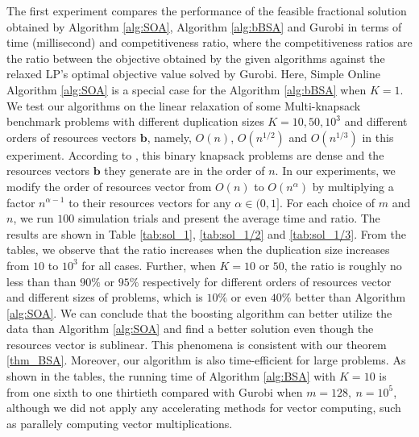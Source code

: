 \documentclass{article} %
\begin{document}
The first experiment compares the performance of the feasible fractional solution obtained by Algorithm \ref{alg:SOA}, Algorithm \ref{alg:bBSA} and Gurobi in terms of time (millisecond) and competitiveness ratio, where the competitiveness ratios are the ratio between the objective obtained by the given algorithms against the relaxed LP's optimal objective value solved by Gurobi. Here, Simple Online Algorithm \ref{alg:SOA} is a special case for the Algorithm \ref{alg:bBSA} when $K=1$. We test our algorithms on the linear relaxation of some Multi-knapsack benchmark problems \citep{chu1998genetic} with different duplication sizes $K=10,50,10^3$ and different orders of resources vectors $\bm{b}$, namely, $O(n)$, $O(n^{1/2})$ and $O(n^{1/3})$ in this experiment. 
According to \cite{chu1998genetic}, this binary knapsack problems are dense and the resources vectors $\bm{b}$ they generate are in the order of $n$. In our experiments, we modify the order of resources vector from $O(n)$ to $O(n^\alpha)$ by multiplying a factor $n^{\alpha-1}$ to their resources vectors for any $\alpha\in(0,1]$. For each choice of $m$ and $n$, we run $100$ simulation trials and present the average time and ratio. 
The results are shown in Table \ref{tab:sol_1}, \ref{tab:sol_1/2} and \ref{tab:sol_1/3}. From the tables, we observe that the ratio increases when the duplication size increases from $10$ to $10^3$ for all cases. Further, when $K=10$ or $50$, the ratio is roughly no less than than $90\%$ or $95\%$ respectively for different orders of resources vector and different sizes of problems, which is $10\%$ or even $40\%$ better than Algorithm \ref{alg:SOA}. We can conclude that the boosting algorithm can better utilize the data than Algorithm \ref{alg:SOA} and find a better solution even though the resources vector is sublinear. This phenomena is consistent with our theorem \ref{thm_BSA}. Moreover, our algorithm is also time-efficient for large problems. As shown in the tables, the running time of Algorithm \ref{alg:BSA} with $K=10$ is from one sixth to one thirtieth compared with Gurobi when $m=128,\ n=10^5$, although we did not apply any accelerating methods for vector computing, such as parallely computing vector multiplications.
\end{document}
